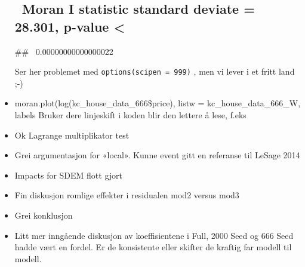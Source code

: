 \documentclass[
]{article}
\newenvironment{Shaded}{\begin{snugshade}}{\end{snugshade}}
\newcommand{\AttributeTok}[1]{\textcolor[rgb]{0.77,0.63,0.00}{#1}}
\newcommand{\CommentTok}[1]{\textcolor[rgb]{0.56,0.35,0.01}{\textit{#1}}}
\newcommand{\ConstantTok}[1]{\textcolor[rgb]{0.00,0.00,0.00}{#1}}
\newcommand{\DecValTok}[1]{\textcolor[rgb]{0.00,0.00,0.81}{#1}}
\newcommand{\FloatTok}[1]{\textcolor[rgb]{0.00,0.00,0.81}{#1}}
\newcommand{\FunctionTok}[1]{\textcolor[rgb]{0.00,0.00,0.00}{#1}}
\newcommand{\NormalTok}[1]{#1}
\newcommand{\SpecialCharTok}[1]{\textcolor[rgb]{0.00,0.00,0.00}{#1}}
\begin{document}
\begin{itemize}
{  \subsection{~Moran I statistic standard deviate = 28.301, p-value
  \textless{}}\label{moran-i-statistic-standard-deviate-28.301-p-value}}

  \#\# ~0.00000000000000022

  Ser her problemet med \texttt{options(scipen\ =\ 999)} , men vi lever
  i et fritt land ;-)
\item
  moran.plot(log(kc\_house\_data\_666\$price), listw =
  kc\_house\_data\_666\_W, labels Bruker dere linjeskift i koden blir
  den lettere å lese, f.eks

\begin{Shaded}
\end{Shaded}
\item
  Ok Lagrange multiplikator test
\item
  Grei argumentasjon for «local». Kunne event gitt en referanse til
  LeSage 2014
\item
  Impacts for SDEM flott gjort
\item
  Fin diskusjon romlige effekter i residualen mod2 versus mod3
\item
  Grei konklusjon
\item
  Litt mer inngående diskusjon av koeffisientene i Full, 2000 Seed og
  666 Seed hadde vært en fordel. Er de konsistente eller skifter de
  kraftig far modell til modell.\\
\end{itemize}
\end{document}
